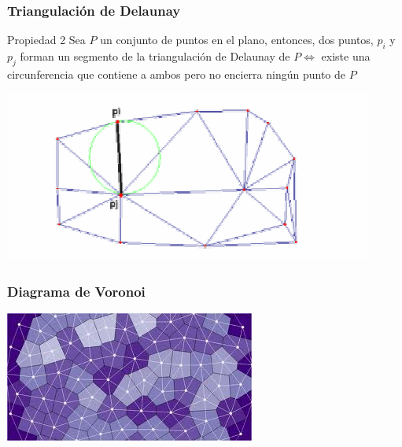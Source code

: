 \begin{frame}
  \frametitle{Triangulación de Delaunay}
  \begin{beamerboxesrounded}[shadow=true]{Propiedad 2}
    Sea $P$ un conjunto de puntos en el plano, entonces, dos puntos, $p_i$ y
    $p_j$ forman un segmento de la triangulación de Delaunay de $P
    \Leftrightarrow$ existe una circunferencia que contiene a ambos pero no
    encierra ningún punto de $P$
  \end{beamerboxesrounded}
  \begin{center}
  \includegraphics[height=0.20\textwidth]{images/propiedad2}
  \end{center}
\end{frame}
\begin{frame}
  \frametitle{Diagrama de Voronoi}
  \begin{center}
  \includegraphics[height=0.20\textwidth]{images/voronoi}
  \end{center}
\end{frame}
